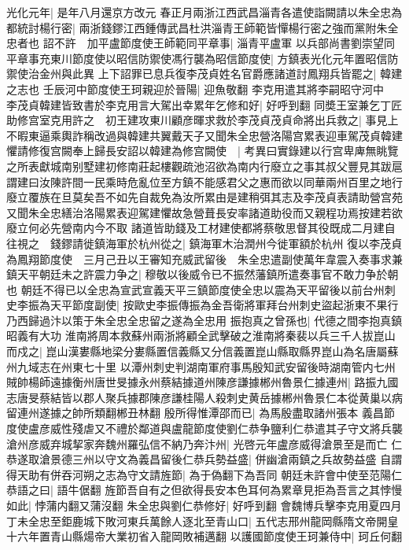 光化元年|{
	是年八月還京方改元}
春正月兩浙江西武昌淄青各遣使詣闕請以朱全忠為都統討楊行密|{
	兩浙錢鏐江西鍾傳武昌杜洪淄青王師範皆憚楊行密之強而黨附朱全忠者也}
詔不許　加平盧節度使王師範同平章事|{
	淄青平盧軍}
以兵部尚書劉崇望同平章事充東川節度使以昭信防禦使馮行襲為昭信節度使|{
	方鎮表光化元年置昭信防禦使治金州與此異}
上下詔罪已息兵復李茂貞姓名官爵應諸道討鳳翔兵皆罷之|{
	韓建之志也}
壬辰河中節度使王珂親迎於晉陽|{
	迎魚敬翻}
李克用遣其將李嗣昭守河中　李茂貞韓建皆致書於李克用言大駕出幸累年乞修和好|{
	好呼到翻}
同奬王室兼乞丁匠助修宫室克用許之　初王建攻東川顧彦暉求救於李茂貞茂貞命將出兵救之|{
	事見上}
不暇東逼乘輿詐稱改過與韓建共翼戴天子又聞朱全忠營洛陽宫累表迎車駕茂貞韓建懼請修復宫闕奉上歸長安詔以韓建為修宫闕使　|{
	考異曰實錄建以行宫卑庳無眺覽之所表獻城南别墅建初修南莊起樓觀疏池沼欲為南内行廢立之事其叔父豐見其跋扈謂建曰汝陳許間一民乘時危亂位至方鎮不能感君父之惠而欲以同華兩州百里之地行廢立覆族在旦莫矣吾不如先自裁免為汝所累由是建稍弭其志及李茂貞表請助營宫苑又聞朱全忠繕治洛陽累表迎駕建懼故急營葺長安率諸道助役而又親程功焉按建若欲廢立何必先營南内今不取}
諸道皆助錢及工材建使都將蔡敬思督其役既成二月建自往視之　錢鏐請徙鎮海軍於杭州從之|{
	鎮海軍木治潤州今徙軍額於杭州}
復以李茂貞為鳳翔節度使　三月己丑以王審知充威武留後　朱全忠遣副使萬年韋震入奏事求兼鎮天平朝廷未之許震力争之|{
	穆敬以後威令已不振然藩鎮所遣奏事官不敢力争於朝也}
朝廷不得已以全忠為宣武宣義天平三鎮節度使全忠以震為天平留後以前台州刺史李振為天平節度副使|{
	按歐史李振傳振為金吾衛將軍拜台州刺史盜起浙東不果行乃西歸過汴以策于朱全忠全忠留之遂為全忠用}
振抱真之曾孫也|{
	代德之間李抱真鎮昭義有大功}
淮南將周本救蘇州兩浙將顧全武擊破之淮南將秦裴以兵三千人拔崑山而戍之|{
	崑山漢婁縣地梁分婁縣置信義縣又分信義置崑山縣取縣界崑山為名唐屬蘇州九域志在州東七十里}
以潭州刺史判湖南軍府事馬殷知武安留後時湖南管内七州賊帥楊師遠據衡州唐世旻據永州蔡結據道州陳彦謙據郴州魯景仁據連州|{
	路振九國志唐旻蔡結皆以郡人聚兵據郡陳彦謙桂陽人殺刺史黄岳據郴州魯景仁本從黄巢以病留連州遂據之帥所類翻郴丑林翻}
殷所得惟潭邵而已|{
	為馬殷盡取諸州張本}
義昌節度使盧彦威性殘虐又不禮於鄰道與盧龍節度使劉仁恭争鹽利仁恭遣其子守文將兵襲滄州彦威弃城挈家奔魏州羅弘信不納乃奔汴州|{
	光啓元年盧彦威得滄景至是而亡}
仁恭遂取滄景德三州以守文為義昌留後仁恭兵勢益盛|{
	併幽滄兩鎮之兵故勢益盛}
自謂得天助有併吞河朔之志為守文請旌節|{
	為于偽翻下為吾同}
朝廷未許會中使至范陽仁恭語之曰|{
	語牛倨翻}
旌節吾自有之但欲得長安本色耳何為累章見拒為吾言之其悖慢如此|{
	悖蒲内翻又蒲沒翻}
朱全忠與劉仁恭修好|{
	好呼到翻}
會魏博兵擊李克用夏四月丁未全忠至鉅鹿城下敗河東兵萬餘人逐北至青山口|{
	五代志邢州龍岡縣隋文帝開皇十六年置青山縣煬帝大業初省入龍岡敗補邁翻}
以護國節度使王珂兼侍中|{
	珂丘何翻}
